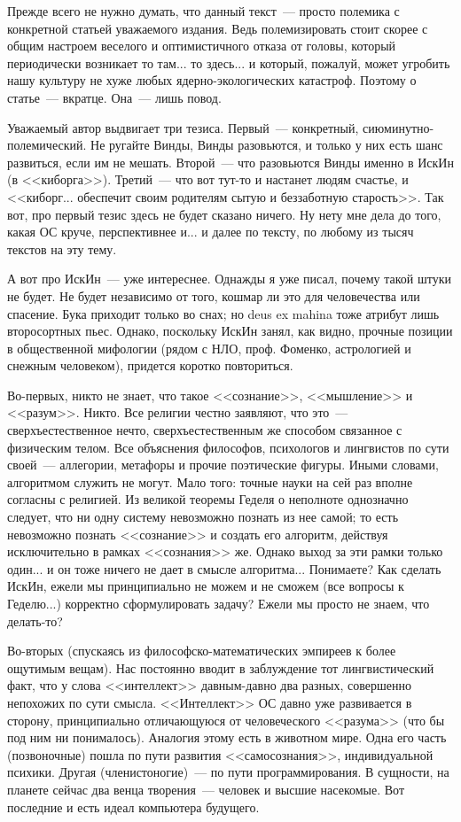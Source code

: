 \documentclass{scrbook}
\newcommand{\flqq}{<<}
\newcommand{\frqq}{>>}
\newcommand{\mdash}{~--- }
\begin{document}
Прежде всего не нужно думать, что данный текст{\mdash}просто полемика с конкретной статьей уважаемого издания. Ведь полемизировать стоит скорее с общим настроем веселого и оптимистичного отказа от головы, который периодически возникает то там... то здесь... и который, пожалуй, может угробить нашу культуру не хуже любых ядерно-экологических катастроф. Поэтому о статье{\mdash}вкратце. Она{\mdash}лишь повод.

Уважаемый автор выдвигает три тезиса. Первый{\mdash}конкретный, сиюминутно-полемический. Не ругайте Винды, Винды разовьются, и только у них есть шанс развиться, если им не мешать. Второй{\mdash}что разовьются Винды именно в ИскИн (в {\flqq}киборга{\frqq}). Третий{\mdash}что вот тут-то и настанет людям счастье, и {\flqq}киборг... обеспечит своим родителям сытую и беззаботную старость{\frqq}. Так вот, про первый тезис здесь не будет сказано ничего. Ну нету мне дела до того, какая ОС круче, перспективнее и... и далее по тексту, по любому из тысяч текстов на эту тему.

А вот про ИскИн{\mdash}уже интереснее. Однажды я уже писал, почему такой штуки не будет. Не будет независимо от того, кошмар ли это для человечества или спасение. Бука приходит только во снах; но deus ex mahina тоже атрибут лишь второсортных пьес. Однако, поскольку ИскИн занял, как видно, прочные позиции в общественной мифологии (рядом с НЛО, проф. Фоменко, астрологией и снежным человеком), придется коротко повториться.

Во-первых, никто не знает, что такое {\flqq}сознание{\frqq}, {\flqq}мышление{\frqq} и {\flqq}разум{\frqq}. Никто. Все религии честно заявляют, что это{\mdash}сверхъестественное нечто, сверхъестественным же способом связанное с физическим телом. Все объяснения философов, психологов и лингвистов по сути своей{\mdash}аллегории, метафоры и прочие поэтические фигуры. Иными словами, алгоритмом служить не могут. Мало того: точные науки на сей раз вполне согласны с религией. Из великой теоремы Геделя о неполноте однозначно следует, что ни одну систему невозможно познать из нее самой; то есть невозможно познать {\flqq}сознание{\frqq} и создать его алгоритм, действуя исключительно в рамках {\flqq}сознания{\frqq} же. Однако выход за эти рамки только один... и он тоже ничего не дает в смысле алгоритма... Понимаете? Как сделать ИскИн, ежели мы принципиально не можем и не сможем (все вопросы к Геделю...) корректно сформулировать задачу? Ежели мы просто не знаем, что делать-то?

Во-вторых (спускаясь из философско-математических эмпиреев к более ощутимым вещам). Нас постоянно вводит в заблуждение тот лингвистический факт, что у слова {\flqq}интеллект{\frqq} давным-давно два разных, совершенно непохожих по сути смысла. {\flqq}Интеллект{\frqq} ОС давно уже развивается в сторону, принципиально отличающуюся от человеческого {\flqq}разума{\frqq} (что бы под ним ни понималось). Аналогия этому есть в животном мире. Одна его часть (позвоночные) пошла по пути развития {\flqq}самосознания{\frqq}, индивидуальной психики. Другая (членистоногие){\mdash}по пути программирования. В сущности, на планете сейчас два венца творения{\mdash}человек и высшие насекомые. Вот последние и есть идеал компьютера будущего.
\end{document}
